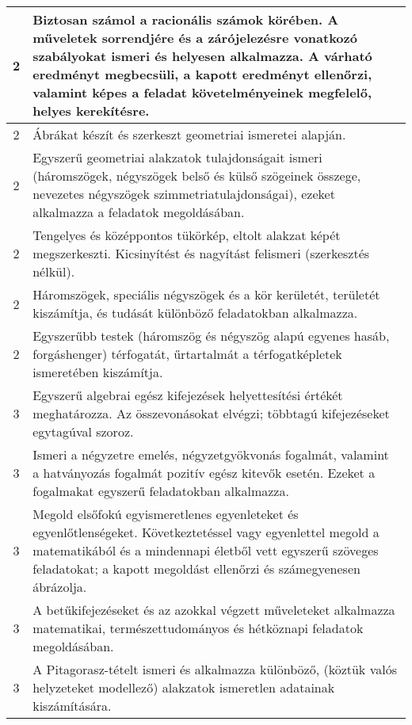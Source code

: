 \begin{longtable}{c | p{12cm} }
                                
                                          2 &  Biztosan számol a racionális számok körében. A műveletek sorrendjére és a zárójelezésre vonatkozó szabályokat ismeri és helyesen alkalmazza. A várható eredményt megbecsüli, a kapott  eredményt ellenőrzi, valamint képes a feladat követelményeinek megfelelő, helyes kerekítésre. \\ \hline
                                          2 &  Ábrákat készít és szerkeszt geometriai ismeretei alapján. \\ \hline
                                          2 &  Egyszerű geometriai alakzatok tulajdonságait ismeri (háromszögek, négyszögek belső és külső szögeinek összege, nevezetes négyszögek szimmetriatulajdonságai), ezeket alkalmazza a feladatok megoldásában. \\ \hline
                                          2 &  Tengelyes és középpontos tükörkép, eltolt alakzat képét megszerkeszti. Kicsinyítést és nagyítást felismeri (szerkesztés nélkül). \\ \hline
                                          2 &  Háromszögek, speciális négyszögek és a kör kerületét, területét kiszámítja, és tudását különböző feladatokban alkalmazza. \\ \hline
                                          2 &  Egyszerűbb testek (háromszög és négyszög alapú egyenes hasáb, forgáshenger) térfogatát, űrtartalmát a térfogatképletek ismeretében kiszámítja. \\ \hline
                                      
                                
                                          3 &  Egyszerű algebrai egész kifejezések helyettesítési értékét meghatározza. Az összevonásokat elvégzi; többtagú kifejezéseket egytagúval szoroz. \\ \hline
                                          3 &  Ismeri a négyzetre emelés, négyzetgyökvonás fogalmát, valamint a hatványozás fogalmát pozitív egész kitevők esetén. Ezeket a fogalmakat egyszerű feladatokban alkalmazza. \\ \hline
                                          3 &  Megold elsőfokú egyismeretlenes egyenleteket és egyenlőtlenségeket. Következtetéssel vagy egyenlettel megold a matematikából és a mindennapi életből vett egyszerű szöveges feladatokat; a kapott megoldást ellenőrzi és számegyenesen ábrázolja. \\ \hline
                                          3 &  A betűkifejezéseket és az azokkal végzett műveleteket alkalmazza matematikai, természettudományos és hétköznapi feladatok megoldásában. \\ \hline
                                          3 &  A Pitagorasz-tételt ismeri és alkalmazza különböző, (köztük valós helyzeteket modellező) alakzatok ismeretlen adatainak kiszámítására. \\ \hline
                                      

\end{longtable}
